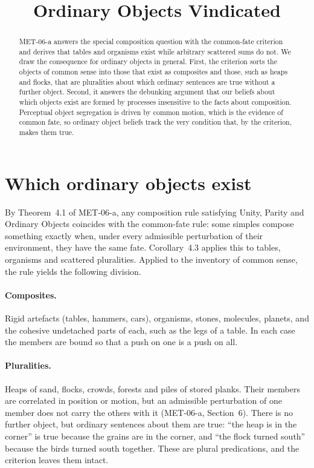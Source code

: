 \documentclass{situationist-preprint}
\title{Ordinary Objects Vindicated}
\begin{document}
\maketitle

\begin{abstract}
MET-06-a answers the special composition question with the common-fate criterion and derives that tables and organisms exist while arbitrary scattered sums do not. We draw the consequence for ordinary objects in general. First, the criterion sorts the objects of common sense into those that exist as composites and those, such as heaps and flocks, that are pluralities about which ordinary sentences are true without a further object. Second, it answers the debunking argument that our beliefs about which objects exist are formed by processes insensitive to the facts about composition. Perceptual object segregation is driven by common motion, which is the evidence of common fate, so ordinary object beliefs track the very condition that, by the criterion, makes them true.
\end{abstract}

\section{Which ordinary objects exist}

By Theorem~4.1 of MET-06-a, any composition rule satisfying Unity, Parity and Ordinary Objects coincides with the common-fate rule: some simples compose something exactly when, under every admissible perturbation of their environment, they have the same fate. Corollary~4.3 applies this to tables, organisms and scattered pluralities. Applied to the inventory of common sense, the rule yields the following division.

\paragraph{Composites.} Rigid artefacts (tables, hammers, cars), organisms, stones, molecules, planets, and the cohesive undetached parts of each, such as the legs of a table. In each case the members are bound so that a push on one is a push on all.

\paragraph{Pluralities.} Heaps of sand, flocks, crowds, forests and piles of stored planks. Their members are correlated in position or motion, but an admissible perturbation of one member does not carry the others with it (MET-06-a, Section~6). There is no further object, but ordinary sentences about them are true: \enquote{the heap is in the corner} is true because the grains are in the corner, and \enquote{the flock turned south} because the birds turned south together. These are plural predications, and the criterion leaves them intact.
\end{document}
